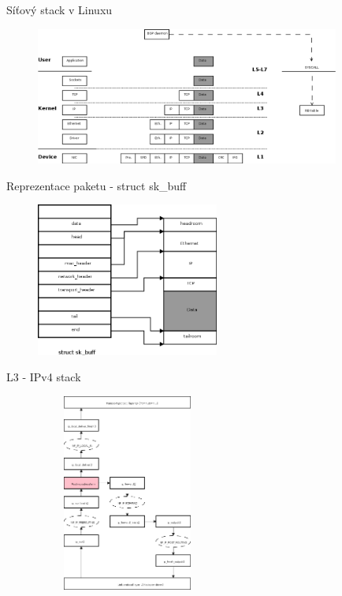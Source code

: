 \documentclass{beamer}
\begin{document}
\begin{frame}{Síťový stack v Linuxu}
	\begin{figure}
			\centering
			\includegraphics[width=10cm,keepaspectratio]{fig/layers.png}
		\end{figure}
\end{frame}

\begin{frame}{Reprezentace paketu - struct sk\_buff}
	\begin{figure}
		\centering
		\includegraphics[width=6cm,keepaspectratio]{fig/skb.png}
	\end{figure}
\end{frame}

\begin{frame}{L3 - IPv4 stack}
	\begin{figure}
		\centering
		\includegraphics[width=6cm,height=6.5cm]{fig/kernel-layer3-flow.png}
	\end{figure}
\end{frame}
\end{document}
